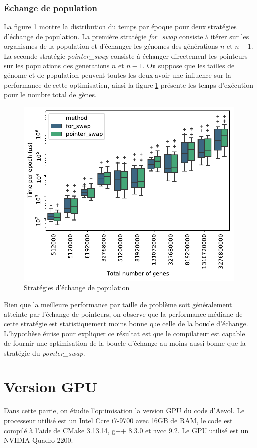 \documentclass[a4paper, 10pt, twoside]{article}
\begin{document}
\subsubsection{Échange de population}

La figure \ref{fig:swap/strat} montre la distribution du temps par époque pour deux stratégies d'échange de population.
La première stratégie \textit{for\_swap} consiste à itérer sur les organismes de la population et d'échanger les génomes des générations $n$ et $n-1$.
La seconde stratégie \textit{pointer\_swap} consiste à échanger directement les pointeurs sur les populations des générations $n$ et $n-1$.
On suppose que les tailles de génome et de population peuvent toutes les deux avoir une influence sur la performance de cette optimisation, ainsi la figure \ref{fig:swap/strat} présente les temps d'exécution pour le nombre total de gènes.

\begin{figure}[htb]
	\centering
	\includegraphics[width=0.5\linewidth]{img/swap_strategies.pdf}
	\caption{Stratégies d'échange de population}
	\label{fig:swap/strat}
\end{figure}

Bien que la meilleure performance par taille de problème soit généralement atteinte par l'échange de pointeurs, on observe que la performance médiane de cette stratégie est statistiquement moins bonne que celle de la boucle d'échange.
L'hypothèse émise pour expliquer ce résultat est que le compilateur est capable de fournir une optimisation de la boucle d'échange au moins aussi bonne que la stratégie du \textit{pointer\_swap}.

\section{Version GPU}

Dans cette partie, on étudie l'optimisation la version GPU du code d'Aevol. Le processeur utilisé est un Intel Core i7-9700 avec 16GB de RAM, le code est compilé à l'aide de CMake 3.13.14, g++ 8.3.0 et nvcc 9.2. Le GPU utilisé est un NVIDIA Quadro 2200.
\end{document}
